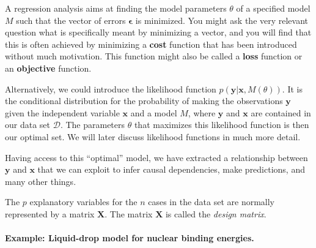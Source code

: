\documentclass[%
oneside,                 %
final,                   %
10pt]{article}
\newenvironment{block_mdfboxadmon}[1][]{
\begin{block_mdfboxmdframed}[frametitle=#1]
}
{
\end{block_mdfboxmdframed}
}
\begin{document}


\begin{block_mdfboxadmon}[]
A regression analysis aims at finding the model parameters $\theta$ of a specified model $M$ such that the vector of errors $\bm{\epsilon}$ is minimized. You might ask the very relevant question what is specifically meant by minimizing a vector, and you will find that this is often achieved by minimizing a \textbf{cost} function that has been introduced without much motivation. This function might also be called a \textbf{loss} function or an \textbf{objective} function.

Alternatively, we could introduce the likelihood function $p(\bm{y} \vert \bm{x}, M(\theta))$.  It is the conditional distribution for the probability of making the observations $\bm{y}$ given the independent variable $\bm{x}$ and a model $M$, where $\bm{y}$ and $\bm{x}$ are contained in our data set $\mathcal{D}$. The parameters $\theta$ that maximizes this likelihood function is then our optimal set. We will later discuss likelihood functions in much more detail.

Having access to this ``optimal'' model, we have extracted a relationship between $\bm{y}$ and $\bm{x}$ that we can exploit to infer causal dependencies, make predictions, and many other things.
\end{block_mdfboxadmon} %




\begin{block_mdfboxadmon}[]
The $p$ explanatory variables for the $n$ cases in the data set are normally represented by a matrix $\mathbf{X}$. The matrix $\mathbf{X}$ is called the \emph{design
matrix}.
\end{block_mdfboxadmon} %





\paragraph{Example: Liquid-drop model for nuclear binding energies.}
\end{document}
